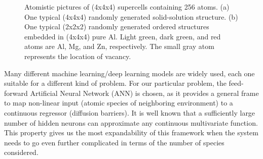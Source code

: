 \begingroup
\begin{figure}[!ht]
  \centering
\caption[Atomistic pictures of (4x4x4) supercells containing 256 atoms.]{Atomistic pictures of (4x4x4) supercells containing 256 atoms. (a) One typical (4x4x4) randomly generated solid-solution structure. (b) One typical (2x2x2) randomly generated ordered structures embedded in (4x4x4) pure Al. Light green, dark green, and red atoms are Al, Mg, and Zn, respectively. The small gray atom represents the location of vacancy.}
\label{Chap:Al/Vac:fig:atomic_illu}
\end{figure}
\endgroup


Many different machine learning/deep learning models are widely used, each one suitable for a different kind of problem. \cite{bartok2010gaussian,behler2011atom,szlachta2014accuracy,artrith2016implementation,mehta2014exact,artrith2017efficient} For our particular problem, the feed-forward Artificial Neural Network (ANN) is chosen, as it provides a general frame to map non-linear input (atomic species of neighboring environment) to a continuous regressor (diffusion barriers). It is well known that a sufficiently large number of hidden neurons can approximate any continuous multivariate function. \cite{hornik1989multilayer} This property gives us the most expandability of this framework when the system needs to go even further complicated in terms of the number of species considered. 


